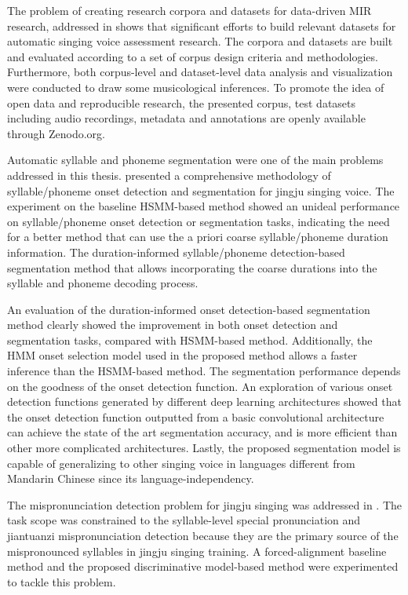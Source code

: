 The problem of creating research corpora and datasets for data-driven MIR research, addressed in  shows that significant efforts to build relevant datasets for automatic singing voice assessment research. The corpora and datasets are built and evaluated according to a set of corpus design criteria and methodologies. Furthermore, both corpus-level and dataset-level data analysis and visualization were conducted to draw some musicological inferences. To promote the idea of open data and reproducible research, the presented corpus, test datasets including audio recordings, metadata and annotations are openly available through Zenodo.org.

Automatic syllable and phoneme segmentation were one of the main problems addressed in this thesis.  presented a comprehensive methodology of syllable/phoneme onset detection and segmentation for jingju singing voice. The experiment on the baseline HSMM-based method showed an unideal performance on syllable/phoneme onset detection or segmentation tasks, indicating the need for a better method that can use the a priori coarse syllable/phoneme duration information. The duration-informed syllable/phoneme detection-based segmentation method that allows incorporating the coarse durations into the syllable and phoneme decoding process.

An evaluation of the duration-informed onset detection-based segmentation method clearly showed the improvement in both onset detection and segmentation tasks, compared with HSMM-based method. Additionally, the HMM onset selection model used in the proposed method allows a faster inference than the HSMM-based method. The segmentation performance depends on the goodness of the onset detection function. An exploration of various onset detection functions generated by different deep learning architectures showed that the onset detection function outputted from a basic convolutional architecture can achieve the state of the art segmentation accuracy, and is more efficient than other more complicated architectures. Lastly, the proposed segmentation model is capable of generalizing to other singing voice in languages different from Mandarin Chinese since its language-independency.

The mispronunciation detection problem for jingju singing was addressed in . The task scope was constrained to the syllable-level special pronunciation and jiantuanzi mispronunciation detection because they are the primary source of the mispronounced syllables in jingju singing training. A forced-alignment baseline method and the proposed discriminative model-based method were experimented to tackle this problem.

